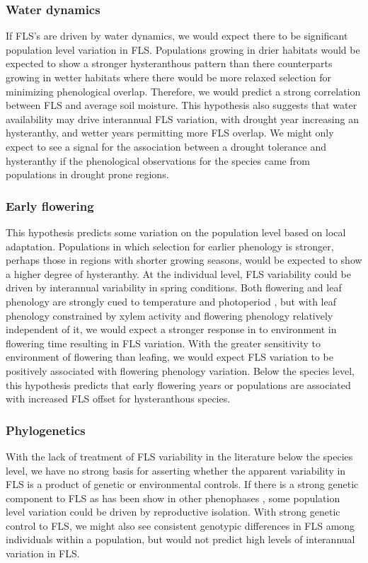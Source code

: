 \documentclass[12pt]{article}\usepackage[]{graphicx}\usepackage[]{color}
\begin{document}
\subsubsection*{Water dynamics} 
\indent\indent If FLS's are driven by water dynamics, we would expect there to be significant population level variation in FLS. Populations growing in drier habitats would be expected to show a stronger hysteranthous pattern than there counterparts growing in wetter habitats where there would be more relaxed selection for minimizing phenological overlap. Therefore, we would predict a strong correlation between FLS and average soil moisture. This hypothesis also suggests that water availability may drive interannual FLS variation, with drought year increasing an hysteranthy, and wetter years permitting more FLS overlap. We might only expect to see a signal for the association between a drought tolerance and hysteranthy if the phenological observations for the species came from populations in drought prone regions. 
\subsubsection*{Early flowering} 
\indent\indent This hypothesis predicts some variation on the population level based on local adaptation. Populations in which selection for earlier phenology is stronger, perhaps those in regions with shorter growing seasons, would be expected to show a higher degree of hysteranthy.  At the individual level, FLS variability could be driven by interannual variability in spring conditions. Both flowering and leaf phenology are strongly cued to temperature and photoperiod \citep{Flynn2018,Rathcke_1985}, but with leaf phenology constrained by xylem activity and flowering phenology relatively independent of it, we would expect a stronger response in to environment in flowering time resulting in FLS variation. With the greater sensitivity to environment of flowering than leafing, we would expect FLS variation to be positively associated with flowering phenology variation. Below the species level, this hypothesis predicts that early flowering years or populations are associated with increased FLS offset for hysteranthous species.
\subsubsection*{Phylogenetics} 
\indent\indent With the lack of treatment of FLS variability in the literature below the species level, we have no strong basis for asserting whether the apparent variability in FLS is a product of genetic or environmental controls. If there is a strong genetic component to FLS as has been show in other phenophases \citep{Wilczek2010}, some population level variation could be driven by reproductive isolation. With strong genetic control to FLS, we might also see consistent genotypic differences in FLS among individuals within a population, but would not predict high levels of interannual variation in FLS.\\
\end{document}
